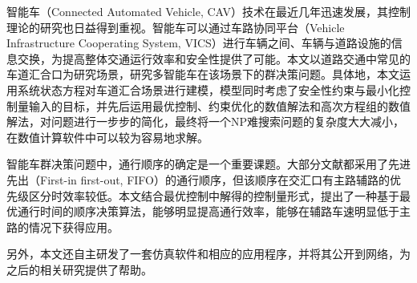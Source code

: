 \begin{cabstract}


  智能车（Connected Automated Vehicle, CAV）技术在最近几年迅速发展，其控制理论的研究也日益得到重视。智能车可以通过车路协同平台（Vehicle Infrastructure Cooperating System, VICS）进行车辆之间、车辆与道路设施的信息交换，为提高整体交通运行效率和安全性提供了可能。本文以道路交通中常见的车道汇合口为研究场景，研究多智能车在该场景下的群决策问题。具体地，本文运用系统状态方程对车道汇合场景进行建模，模型同时考虑了安全性约束与最小化控制量输入的目标，并先后运用最优控制、约束优化的数值解法和高次方程组的数值解法，对问题进行一步步的简化，最终将一个NP难搜索问题的复杂度大大减小，在数值计算软件中可以较为容易地求解。

  智能车群决策问题中，通行顺序的确定是一个重要课题。大部分文献都采用了先进先出（First-in first-out, FIFO）的通行顺序，但该顺序在交汇口有主路辅路的优先级区分时效率较低。本文结合最优控制中解得的控制量形式，提出了一种基于最优通行时间的顺序决策算法，能够明显提高通行效率，能够在辅路车速明显低于主路的情况下获得应用。

  另外，本文还自主研发了一套仿真软件和相应的应用程序，并将其公开到网络，为之后的相关研究提供了帮助。



\end{cabstract}

